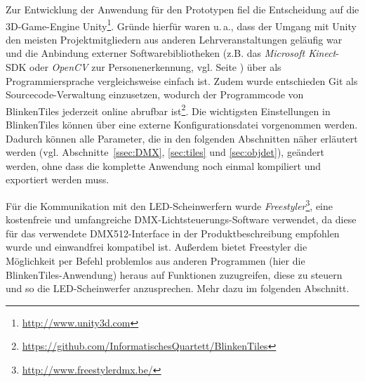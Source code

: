 \label{ssec:entscheidungen}

Zur Entwicklung der Anwendung für den Prototypen fiel die Entscheidung auf die 3D-Game-Engine Unity\footnote{\url{http://www.unity3d.com}}. Gründe hierfür waren u.\,a., dass der Umgang mit Unity den meisten Projektmitgliedern aus anderen Lehrveranstaltungen geläufig war und die Anbindung externer Softwarebibliotheken (z.B. das \emph{Microsoft Kinect}-SDK oder \emph{OpenCV} zur Personenerkennung, vgl. Seite \pageref{sec:objdet}) über \CS{} als Programmiersprache vergleichsweise einfach ist. Zudem wurde entschieden Git als Sourcecode-Verwaltung einzusetzen, wodurch der Programmcode von BlinkenTiles jederzeit online abrufbar ist\footnote{\url{https://github.com/InformatischesQuartett/BlinkenTiles}}. Die wichtigsten Einstellungen in BlinkenTiles können über eine externe Konfigurationsdatei vorgenommen werden. Dadurch können alle Parameter, die in den folgenden Abschnitten näher erläutert werden (vgl. Abschnitte~\ref{ssec:DMX}, \ref{sec:tiles} und \ref{sec:objdet}), geändert werden, ohne dass die komplette Anwendung noch einmal kompiliert und exportiert werden muss.

Für die Kommunikation mit den LED-Scheinwerfern wurde \emph{Freestyler}\footnote{\url{http://www.freestylerdmx.be/}}, eine kostenfreie und umfangreiche DMX-Lichtsteuerungs-Software verwendet, da diese für das verwendete DMX512-Interface in der Produktbeschreibung empfohlen wurde und einwandfrei kompatibel ist. Außerdem bietet Freestyler die Möglichkeit per Befehl problemlos aus anderen Programmen (hier die BlinkenTiles-Anwendung) heraus auf Funktionen zuzugreifen, diese zu steuern und so die LED-Scheinwerfer anzusprechen. Mehr dazu im folgenden Abschnitt.

